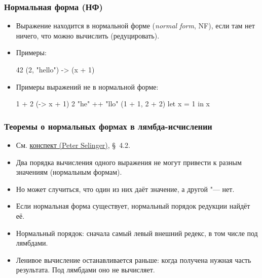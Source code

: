 \documentclass[11pt]{beamer}
\begin{document}
\begin{frame}[fragile]
  \frametitle{Нормальная форма (НФ)}
  \begin{itemize}
    \item Выражение находится в нормальной форме (\emph{normal form}, NF), если там нет ничего, что можно вычислить (редуцировать).
    \item Примеры: \pause
          \begin{haskell}
            42
            (2, "hello")
            \x -> (x + 1)
          \end{haskell}
    \item Примеры выражений не в нормальной форме: \pause
          \begin{haskell}
            1 + 2                 
            (\x -> x + 1) 2       
            "he" ++ "llo"         
            (1 + 1, 2 + 2)
            let x = 1 in x
          \end{haskell}
  \end{itemize}
\end{frame}

\begin{frame}[fragile]
  \frametitle{Теоремы о нормальных формах в лямбда-исчислении}
  \begin{itemize}
    \item См. \href{https://arxiv.org/abs/0804.3434}{конспект (Peter Selinger)}, §~4.2.
    \item Два порядка вычисления одного выражения не могут привести к разным значениям (нормальным формам).
    \item Но может случиться, что один из них даёт значение, а другой "--- нет.
    \item Если нормальная форма существует, нормальный порядок редукции найдёт её.
    \item Нормальный порядок: сначала самый левый внешний редекс, в том числе под лямбдами.
    \item Ленивое вычисление останавливается раньше: когда получена нужная часть результата. Под лямбдами оно не вычисляет.
  \end{itemize}
\end{frame}
\end{document}
